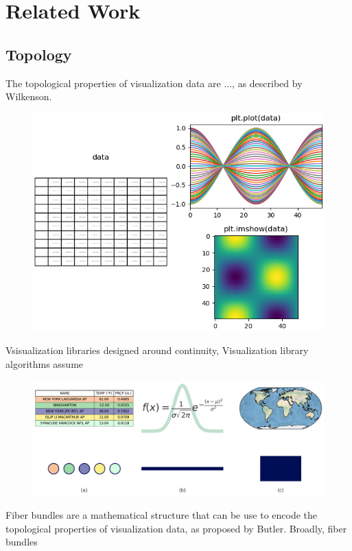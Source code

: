 \documentclass[10pt,journal,compsoc]{IEEEtran}
\theoremstyle{definition}
\theoremstyle{remark}
\begin{document}

\section{Related Work}

\subsection{Topology}
The topological properties of visualization data are ..., as described by Wilkenson\cite{wilkinsonGrammarGraphics2005}. 

\begin{figure}[h!]
  \includegraphics[width=1\columnwidth]{continuity.png}
\end{figure}
Vsisualization libraries designed around continuity,  
Visualization library algorithms assume 

\begin{figure}[h!]
  \includegraphics[width=1\columnwidth]{k_different_types.png}
\end{figure}
Fiber bundles are a mathematical structure that can be use to encode the topological properties of visualization data, as proposed by Butler\cite{butlerVectorBundleClassesForm1992,butlerVisualizationModelBased1989}. Broadly, fiber bundles
\end{document}
